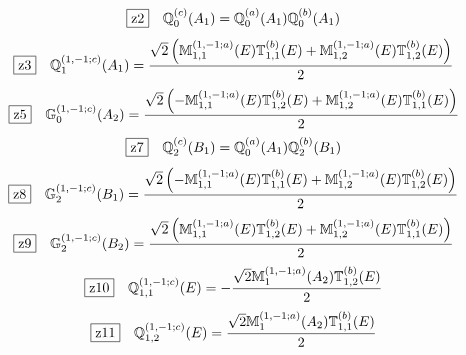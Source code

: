 \documentclass[fleqn,10pt,landscape]{jsarticle}
\begin{document}
\begin{dmath*}
\hspace*{3mm}\fbox{z2}\quad \mathbb{Q}_{0}^{(c)}(A_{1})=\mathbb{Q}_{0}^{(a)}(A_{1}) \mathbb{Q}_{0}^{(b)}(A_{1})
\end{dmath*}
\begin{dmath*}
\hspace*{3mm}\fbox{z3}\quad \mathbb{Q}_{1}^{(1,-1;c)}(A_{1})=\frac{\sqrt{2} \left(\mathbb{M}_{1,1}^{(1,-1;a)}(E) \mathbb{T}_{1,1}^{(b)}(E) + \mathbb{M}_{1,2}^{(1,-1;a)}(E) \mathbb{T}_{1,2}^{(b)}(E)\right)}{2}
\end{dmath*}
\begin{dmath*}
\hspace*{3mm}\fbox{z5}\quad \mathbb{G}_{0}^{(1,-1;c)}(A_{2})=\frac{\sqrt{2} \left(- \mathbb{M}_{1,1}^{(1,-1;a)}(E) \mathbb{T}_{1,2}^{(b)}(E) + \mathbb{M}_{1,2}^{(1,-1;a)}(E) \mathbb{T}_{1,1}^{(b)}(E)\right)}{2}
\end{dmath*}
\begin{dmath*}
\hspace*{3mm}\fbox{z7}\quad \mathbb{Q}_{2}^{(c)}(B_{1})=\mathbb{Q}_{0}^{(a)}(A_{1}) \mathbb{Q}_{2}^{(b)}(B_{1})
\end{dmath*}
\begin{dmath*}
\hspace*{3mm}\fbox{z8}\quad \mathbb{G}_{2}^{(1,-1;c)}(B_{1})=\frac{\sqrt{2} \left(- \mathbb{M}_{1,1}^{(1,-1;a)}(E) \mathbb{T}_{1,1}^{(b)}(E) + \mathbb{M}_{1,2}^{(1,-1;a)}(E) \mathbb{T}_{1,2}^{(b)}(E)\right)}{2}
\end{dmath*}
\begin{dmath*}
\hspace*{3mm}\fbox{z9}\quad \mathbb{G}_{2}^{(1,-1;c)}(B_{2})=\frac{\sqrt{2} \left(\mathbb{M}_{1,1}^{(1,-1;a)}(E) \mathbb{T}_{1,2}^{(b)}(E) + \mathbb{M}_{1,2}^{(1,-1;a)}(E) \mathbb{T}_{1,1}^{(b)}(E)\right)}{2}
\end{dmath*}
\begin{dmath*}
\hspace*{3mm}\fbox{z10}\quad \mathbb{Q}_{1,1}^{(1,-1;c)}(E)=- \frac{\sqrt{2} \mathbb{M}_{1}^{(1,-1;a)}(A_{2}) \mathbb{T}_{1,2}^{(b)}(E)}{2}
\end{dmath*}
\begin{dmath*}
\hspace*{3mm}\fbox{z11}\quad \mathbb{Q}_{1,2}^{(1,-1;c)}(E)=\frac{\sqrt{2} \mathbb{M}_{1}^{(1,-1;a)}(A_{2}) \mathbb{T}_{1,1}^{(b)}(E)}{2}
\end{dmath*}
\vspace{5mm}
\end{document}
